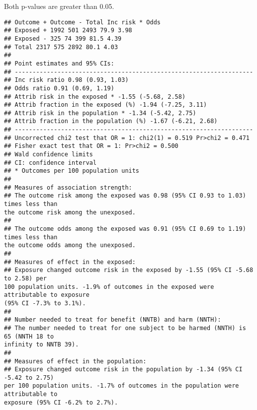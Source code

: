 \documentclass[
]{article}
\newenvironment{Shaded}{\begin{snugshade}}{\end{snugshade}}
\newcommand{\AttributeTok}[1]{\textcolor[rgb]{0.77,0.63,0.00}{#1}}
\newcommand{\ConstantTok}[1]{\textcolor[rgb]{0.00,0.00,0.00}{#1}}
\newcommand{\FunctionTok}[1]{\textcolor[rgb]{0.00,0.00,0.00}{#1}}
\newcommand{\NormalTok}[1]{#1}
\newcommand{\OtherTok}[1]{\textcolor[rgb]{0.56,0.35,0.01}{#1}}
\newcommand{\SpecialCharTok}[1]{\textcolor[rgb]{0.00,0.00,0.00}{#1}}
\newcommand{\StringTok}[1]{\textcolor[rgb]{0.31,0.60,0.02}{#1}}
\begin{document}
Both p-values are greater than 0.05.

\begin{Shaded}
\end{Shaded}

\begin{verbatim}
## Outcome + Outcome - Total Inc risk * Odds
## Exposed + 1992 501 2493 79.9 3.98
## Exposed - 325 74 399 81.5 4.39
## Total 2317 575 2892 80.1 4.03
##
## Point estimates and 95% CIs:
## -------------------------------------------------------------------
## Inc risk ratio 0.98 (0.93, 1.03)
## Odds ratio 0.91 (0.69, 1.19)
## Attrib risk in the exposed * -1.55 (-5.68, 2.58)
## Attrib fraction in the exposed (%) -1.94 (-7.25, 3.11)
## Attrib risk in the population * -1.34 (-5.42, 2.75)
## Attrib fraction in the population (%) -1.67 (-6.21, 2.68)
## -------------------------------------------------------------------
## Uncorrected chi2 test that OR = 1: chi2(1) = 0.519 Pr>chi2 = 0.471
## Fisher exact test that OR = 1: Pr>chi2 = 0.500
## Wald confidence limits
## CI: confidence interval
## * Outcomes per 100 population units
##
## Measures of association strength:
## The outcome risk among the exposed was 0.98 (95% CI 0.93 to 1.03) times less than
the outcome risk among the unexposed.
##
## The outcome odds among the exposed was 0.91 (95% CI 0.69 to 1.19) times less than
the outcome odds among the unexposed.
##
## Measures of effect in the exposed:
## Exposure changed outcome risk in the exposed by -1.55 (95% CI -5.68 to 2.58) per
100 population units. -1.9% of outcomes in the exposed were attributable to exposure
(95% CI -7.3% to 3.1%).
##
## Number needed to treat for benefit (NNTB) and harm (NNTH):
## The number needed to treat for one subject to be harmed (NNTH) is 65 (NNTH 18 to
infinity to NNTB 39).
##
## Measures of effect in the population:
## Exposure changed outcome risk in the population by -1.34 (95% CI -5.42 to 2.75)
per 100 population units. -1.7% of outcomes in the population were attributable to
exposure (95% CI -6.2% to 2.7%).
\end{verbatim}
\end{document}
